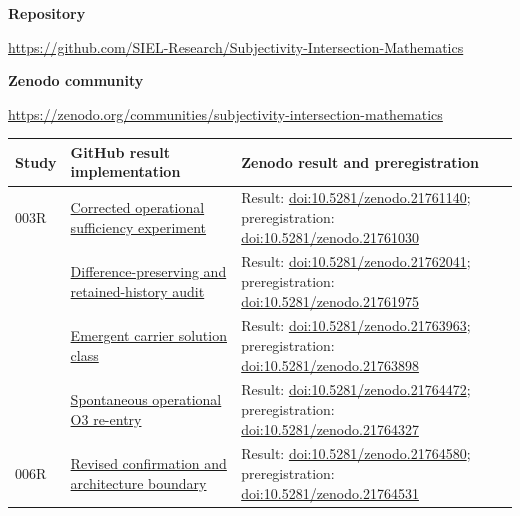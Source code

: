 \documentclass[11pt,a4paper]{article}
\begin{document}
\noindent\textbf{Repository}
\begin{center}
\small\url{https://github.com/SIEL-Research/Subjectivity-Intersection-Mathematics}
\end{center}

\noindent\textbf{Zenodo community}
\begin{center}
\small\url{https://zenodo.org/communities/subjectivity-intersection-mathematics}
\end{center}

\begin{longtable}{@{}>{\raggedright\arraybackslash}p{1.2cm}>{\raggedright\arraybackslash}p{5.0cm}>{\raggedright\arraybackslash}p{7.8cm}@{}}
\toprule
Study & GitHub result implementation & Zenodo result and preregistration \\
\midrule
\endhead
003R & \href{https://github.com/SIEL-Research/Subjectivity-Intersection-Mathematics/tree/main/experiments/003r_subjectivity_agent_class2_o3_corrected}{Corrected operational sufficiency experiment} & Result: \href{https://doi.org/10.5281/zenodo.21761140}{doi:10.5281/zenodo.21761140}; preregistration: \href{https://doi.org/10.5281/zenodo.21761030}{doi:10.5281/zenodo.21761030} \\
004 & \href{https://github.com/SIEL-Research/Subjectivity-Intersection-Mathematics/tree/main/experiments/004_difference_preserving_o3_discrimination}{Difference-preserving and retained-history audit} & Result: \href{https://doi.org/10.5281/zenodo.21762041}{doi:10.5281/zenodo.21762041}; preregistration: \href{https://doi.org/10.5281/zenodo.21761975}{doi:10.5281/zenodo.21761975} \\
005 & \href{https://github.com/SIEL-Research/Subjectivity-Intersection-Mathematics/tree/main/experiments/005_emergent_relational_carrier_solution_class}{Emergent carrier solution class} & Result: \href{https://doi.org/10.5281/zenodo.21763963}{doi:10.5281/zenodo.21763963}; preregistration: \href{https://doi.org/10.5281/zenodo.21763898}{doi:10.5281/zenodo.21763898} \\
006 & \href{https://github.com/SIEL-Research/Subjectivity-Intersection-Mathematics/tree/main/experiments/006_spontaneous_o3_reentry}{Spontaneous operational O3 re-entry} & Result: \href{https://doi.org/10.5281/zenodo.21764472}{doi:10.5281/zenodo.21764472}; preregistration: \href{https://doi.org/10.5281/zenodo.21764327}{doi:10.5281/zenodo.21764327} \\
006R & \href{https://github.com/SIEL-Research/Subjectivity-Intersection-Mathematics/tree/main/experiments/006r_spontaneous_o3_reentry_revised}{Revised confirmation and architecture boundary} & Result: \href{https://doi.org/10.5281/zenodo.21764580}{doi:10.5281/zenodo.21764580}; preregistration: \href{https://doi.org/10.5281/zenodo.21764531}{doi:10.5281/zenodo.21764531} \\

\end{longtable}
\end{document}
